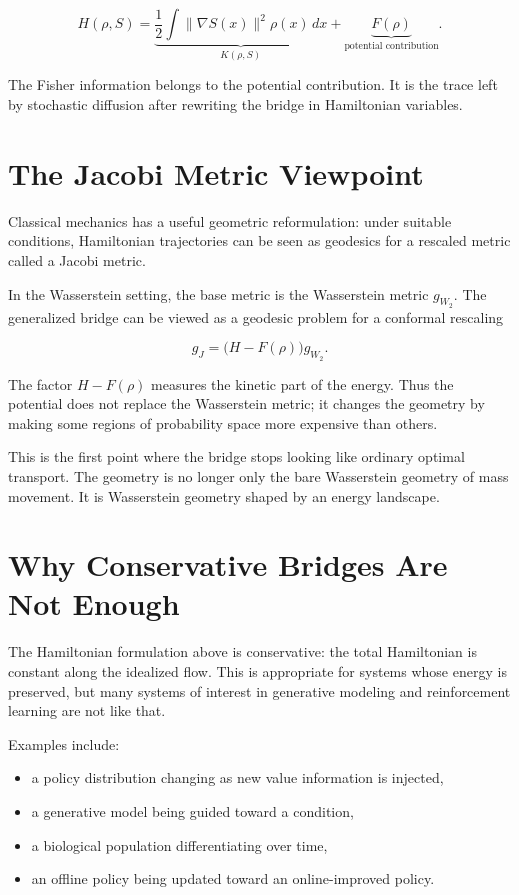 \[
H(\rho,S)
=
\underbrace{
\frac12
\int
\|\nabla S(x)\|^2\rho(x)\,dx
}_{K(\rho,S)}
+
\underbrace{
F(\rho)
}_{\text{potential contribution}}.
\]

The Fisher information belongs to the potential contribution. It is the trace
left by stochastic diffusion after rewriting the bridge in Hamiltonian
variables.

\section{The Jacobi Metric Viewpoint}

Classical mechanics has a useful geometric reformulation: under suitable
conditions, Hamiltonian trajectories can be seen as geodesics for a rescaled
metric called a Jacobi metric.

In the Wasserstein setting, the base metric is the Wasserstein metric
$g_{W_2}$. The generalized bridge can be viewed as a geodesic problem for a
conformal rescaling

\[
g_J
=
\bigl(H-F(\rho)\bigr)g_{W_2}.
\]

The factor $H-F(\rho)$ measures the kinetic part of the energy. Thus the
potential does not replace the Wasserstein metric; it changes the geometry by
making some regions of probability space more expensive than others.

\begin{remark}
This is the first point where the bridge stops looking like ordinary optimal
transport. The geometry is no longer only the bare Wasserstein geometry of
mass movement. It is Wasserstein geometry shaped by an energy landscape.
\end{remark}

\section{Why Conservative Bridges Are Not Enough}

The Hamiltonian formulation above is conservative: the total Hamiltonian is
constant along the idealized flow. This is appropriate for systems whose
energy is preserved, but many systems of interest in generative modeling and
reinforcement learning are not like that.

Examples include:

\begin{itemize}
    \item a policy distribution changing as new value information is injected,
    \item a generative model being guided toward a condition,
    \item a biological population differentiating over time,
    \item an offline policy being updated toward an online-improved policy.
\end{itemize}

